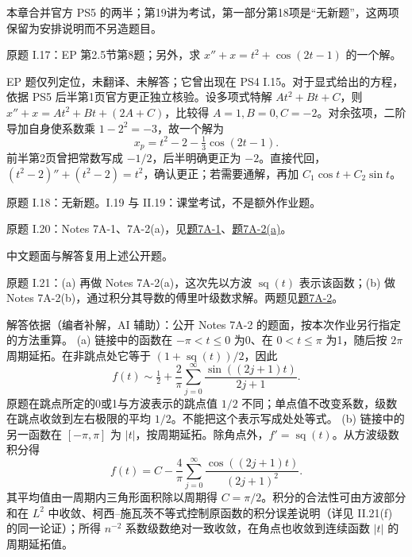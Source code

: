 \label{cw:ps5}
本章合并官方 PS5 的两半；第19讲为考试，第一部分第18项是“无新题”，这两项保留为安排说明而不另造题目。
\begin{exercise}\label{cw:ps5-I-17}
原题 I.17：EP 第2.5节第8题；另外，求 $x''+x=t^2+\cos(2t-1)$ 的一个解。
\end{exercise}
\begin{solution}
EP 题仅列定位，未翻译、未解答；它曾出现在 PS4 I.15。对于显式给出的方程，依据 PS5 后半第1页官方更正独立核验。设多项式特解 $At^2+Bt+C$，则 $x''+x=At^2+Bt+(2A+C)$，比较得 $A=1,B=0,C=-2$。对余弦项，二阶导加自身使系数乘 $1-2^2=-3$，故一个解为
\[
 x_p=t^2-2-\tfrac13\cos(2t-1).
\]
前半第2页曾把常数写成 $-1/2$，后半明确更正为 $-2$。直接代回，$(t^2-2)''+(t^2-2)=t^2$，确认更正；若需要通解，再加 $C_1\cos t+C_2\sin t$。
\end{solution}
原题 I.18：无新题。I.19 与 II.19：课堂考试，不是额外作业题。
\begin{exercise}\label{cw:ps5-I-20}
原题 I.20：Notes 7A-1、7A-2(a)，见\hyperref[cw:bank-7A-1]{题7A-1}、\hyperref[cw:bank-7A-2]{题7A-2(a)}。
\end{exercise}
\begin{solution}中文题面与解答复用上述公开题。\end{solution}
\begin{exercise}\label{cw:ps5-I-21}
原题 I.21：(a) 再做 Notes 7A-2(a)，这次先以方波 $\operatorname{sq}(t)$ 表示该函数；(b) 做 Notes 7A-2(b)，通过积分其导数的傅里叶级数求解。两题见\hyperref[cw:bank-7A-2]{题7A-2}。
\end{exercise}
\begin{solution}
解答依据（编者补解，AI 辅助）：公开 Notes 7A-2 的题面，按本次作业另行指定的方法重算。
(a) 链接中的函数在 $-\pi<t\leq0$ 为0、在 $0<t\leq\pi$ 为1，随后按 $2\pi$ 周期延拓。在非跳点处它等于 $(1+\operatorname{sq}(t))/2$，因此
\[
 f(t)\sim\tfrac12+\frac2\pi\sum_{j=0}^\infty\frac{\sin((2j+1)t)}{2j+1}.
\]
原题在跳点所定的0或1与方波表示的跳点值 $1/2$ 不同；单点值不改变系数，级数在跳点收敛到左右极限的平均 $1/2$。不能把这个表示写成处处等式。
(b) 链接中的另一函数在 $[-\pi,\pi]$ 为 $|t|$，按周期延拓。除角点外，$f'=\operatorname{sq}(t)$。从方波级数积分得
\[
 f(t)=C-\frac4\pi\sum_{j=0}^\infty\frac{\cos((2j+1)t)}{(2j+1)^2}.
\]
其平均值由一周期内三角形面积除以周期得 $C=\pi/2$。积分的合法性可由方波部分和在 $L^2$ 中收敛、柯西--施瓦茨不等式控制原函数的积分误差说明（详见 II.21(f) 的同一论证）；所得 $n^{-2}$ 系数级数绝对一致收敛，在角点也收敛到连续函数 $|t|$ 的周期延拓值。
\end{solution}
